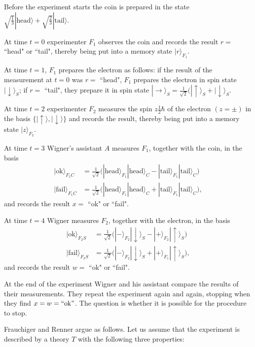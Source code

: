 \documentclass[12pt,a4paper,reqno]{article}
\newcommand{\head}{\text{head}}
\newcommand{\tail}{\text{tail}}
\newcommand{\ok}{\text{ok}}
\newcommand{\fail}{\text{fail}}
\newcommand{\be}{\begin{equation}}
\newcommand{\ee}{\end{equation}}
\renewcommand{\(}{\left(}
\renewcommand{\)}{\right)}
\renewcommand{\.}{\centerdot}
\newcommand{\1}{\mathbf{1}}
\newcommand{\<}{\langle}
\renewcommand{\>}{\rangle}
\newcommand{\half}{\tfrac{1}{2}}
\newcommand{\third}{\tfrac{1}{3}}
\theoremstyle{definition}
\theoremstyle{remark}
\numberwithin{equation}{section}
\begin{document}

Before the experiment starts the coin is prepared in the state 
$\sqrt{\third}|\head\> + \sqrt{\tfrac{2}{3}}|\tail\>$. 

At time $t = 0$ experimenter $F_1$ observes the coin and records the result $r =$ ``head" or ``tail", thereby being put into a memory state $|r\>_{F_1}$.

At time $t = 1$, $F_1$ prepares the electron as follows: if the result of the measurement at $t = 0$ was $r =$ ``head", $F_1$ prepares the electron in spin state $|\downarrow\>_S$; if $r = $ ``tail", they prepare it in spin state $|\rightarrow\>_S = \tfrac{1}{\sqrt{2}}\big(|\uparrow\>_S + |\downarrow\>_S$. 

At time $t = 2$ experimenter $F_2$ measures the spin $z\half\hbar$ of the electron $(z = \pm)$ in the basis $\{|\uparrow\>, |\downarrow\>\}$ and records the result, thereby being put into a memory state $|z\>_{F_2}$.

At time $t = 3$ Wigner's assistant $A$ measures $F_1$, together with the coin, in the basis
\begin{align*}
|\ok\>_{F_1C} &= \tfrac{1}{\sqrt{2}}\big(|\head\>_{F_1}|\head\>_C - |\tail\>_{F_1}|\tail\>_C\big)\\
|\fail\>_{F_1C} &= \tfrac{1}{\sqrt{2}}\big(|\head\>_{F_1}|\head\>_C + |\tail\>_{F_1}|\tail\>_C\big),
\end{align*}
and records the result $x =$ ``ok" or ``fail".

At time $t = 4$ Wigner measures $F_2$, together with the electron, in the basis
\begin{align*}
|\ok\>_{F_2S} &= \tfrac{1}{\sqrt{2}}\big(|-\>_{F_2}|\downarrow\>_S - |+\>_{F_2}|\uparrow\>_S\big)\\
|\fail\>_{F_2S} &= \tfrac{1}{\sqrt{2}}\big(|-\>_{F_2}|\downarrow\>_S + |+\>_{F_1}|\uparrow\>_S\big),
\end{align*}
and records the result $w =$ ``ok" or ``fail".

At the end of the experiment Wigner and his assistant compare the results of their measurements. They repeat the experiment again and again, stopping when they find $x = w = ``\ok"$. The question is whether it is possible for the procedure to stop.

Frauchiger and Renner argue as follows. Let us assume that the experiment is described by a theory $T$ with the following three properties:
\end{document}
